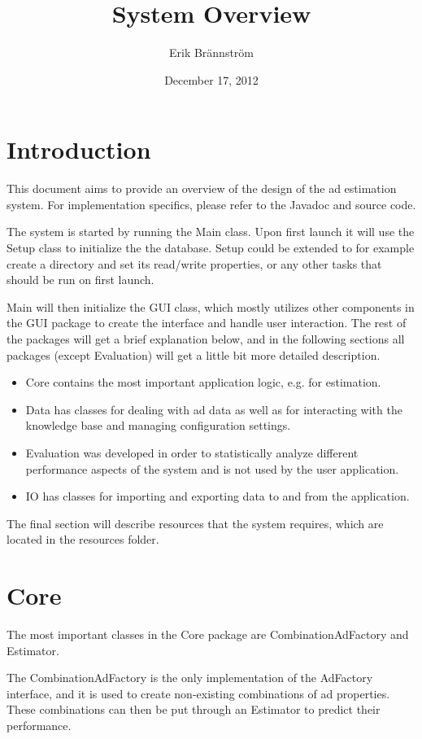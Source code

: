 \documentclass[11pt,twoside,a4paper]{article}
\title{System Overview}
\author{Erik Brännström}
\date{December 17, 2012}
\begin{document}
\maketitle

\section{Introduction}
This document aims to provide an overview of the design of the ad estimation system. For implementation specifics, please refer to the Javadoc and source code.

The system is started by running the Main class. Upon first launch it will use the Setup class to initialize the the database. Setup could be extended to for example create a directory and set its read/write properties, or any other tasks that should be run on first launch.

Main will then initialize the GUI class, which mostly utilizes other components in the GUI package to create the interface and handle user interaction. The rest of the packages will get a brief explanation below, and in the following sections all packages (except Evaluation) will get a little bit more detailed description.

\begin{itemize}
  \item Core contains the most important application logic, e.g. for estimation.
  \item Data has classes for dealing with ad data as well as for interacting with the knowledge base and managing configuration settings.
  \item Evaluation was developed in order to statistically analyze different performance aspects of the system and is not used by the user application.
  \item IO has classes for importing and exporting data to and from the application.
\end{itemize}

The final section will describe resources that the system requires, which are located in the resources folder.

\section{Core}
The most important classes in the Core package are CombinationAdFactory and Estimator.

The CombinationAdFactory is the only implementation of the AdFactory interface, and it is used to create non-existing combinations of ad properties. These combinations can then be put through an Estimator to predict their performance.
\end{document}
